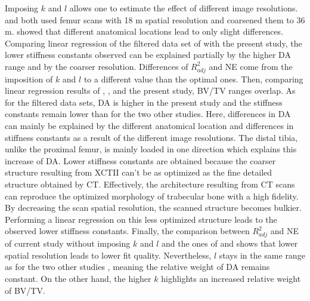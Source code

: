 \documentclass[a4paper,fleqn]{DC_ArtStyle}
\begin{document}
Imposing $k$ and $l$ allows one to estimate the effect of different image resolutions.  \citeauthor{Panyasantisuk2015}\cite{Panyasantisuk2015} and \citeauthor{Gross2013}\cite{Gross2013} both used femur scans with 18 \si{\micro}m spatial resolution and coarsened them to 36 \si{\micro}m. \citeauthor{Gross2013}\cite{Gross2013} showed that different anatomical locations lead to only slight differences. Comparing linear regression of the filtered data set of \citeauthor{Panyasantisuk2015}\cite{Panyasantisuk2015} with the present study, the lower stiffness constants observed can be explained partially by the higher DA range and by the coarser resolution. Differences of $R^2_{adj}$ and NE come from the imposition of $k$ and $l$ to a different value than the optimal ones. Then, comparing linear regression results of \citeauthor{Panyasantisuk2015}\cite{Panyasantisuk2015}, \citeauthor{Gross2013}\cite{Gross2013}, and the present study, BV/TV ranges overlap. As for the filtered data sets, DA is higher in the present study and the stiffness constants remain lower than for the two other studies. Here, differences in DA can mainly be explained by the different anatomical location and differences in stiffness constants as a result of the different image resolutions. The distal tibia, unlike the proximal femur, is mainly loaded in one direction which explains this increase of DA. Lower stiffness constants are obtained because the coarser structure resulting from XCTII can't be as optimized as the fine detailed structure obtained by \si{\micro}CT. Effectively, the architecture resulting from \si{\micro}CT scans can reproduce the optimized morphology of trabecular bone with a high fidelity. By decreasing the scan spatial resolution, the scanned structure becomes bulkier. Performing a linear regression on this less optimized structure leads to the observed lower stiffness constants. Finally, the comparison between $R^2_{adj}$ and NE of current study without imposing $k$ and $l$ and the ones of \citeauthor{Panyasantisuk2015}\cite{Panyasantisuk2015} and  \citeauthor{Gross2013}\cite{Gross2013} shows that lower spatial resolution leads to lower fit quality. Nevertheless, $l$ stays in the same range as for the two other studies \cite{Gross2013,Panyasantisuk2015}, meaning the relative weight of DA remains constant. On the other hand, the higher $k$ highlights an increased relative weight of BV/TV.\\
\end{document}
